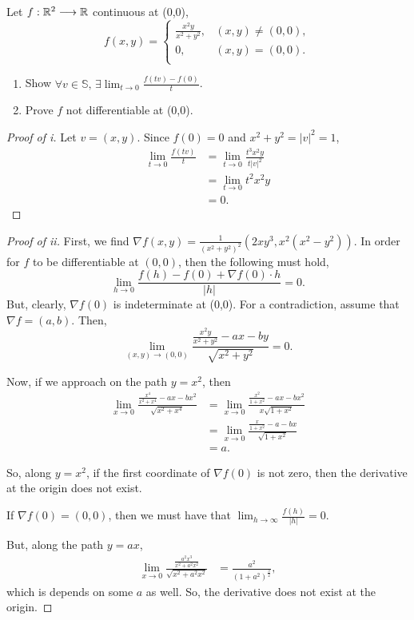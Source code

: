 \documentclass[../hw4]{subfiles}
\begin{document}
\begin{problem}[2]
Let $f:\mathbb{R}^2\longrightarrow\mathbb{R}$ continuous at (0,0), \[
	f(x,y) = \begin{cases}
		\frac{x^2 y}{x^2 + y^2}, & (x,y)\neq (0,0), \\
		0,                       & (x,y)= (0,0).    \\
	\end{cases}
\]
\begin{enumerate}[label=\roman*)]
	\item Show $\forall v \in \mathbb{S},\, \exists \lim_{t \to 0} \frac{f(tv)-f(0)}{t}$.
	\item Prove $f$ not differentiable at (0,0).
\end{enumerate}
\end{problem}
\begin{proof}[Proof of i]
	Let $v=(x,y)$. Since $f(0)=0$ and $x^2 + y^2={|v|}^2=1$, \begin{align*}
		\lim_{t \to 0} \frac{f(tv)}{t} & = \lim_{t \to 0} \frac{t^3x^2y}{t{|v|}^2} \\
		                               & =  \lim_{t \to 0} t^2x^2y                 \\
		                               & = 0
		.\end{align*}
\end{proof}
\begin{proof}[Proof of ii]
	First, we find $\nabla f(x,y) = \frac{1}{{\left( x^2 + y^2 \right) }^2}(2xy^3,x^2\left( x^2 - y^2 \right) )$. In order for $f$ to be differentiable at  $(0,0)$, then the following must hold,  \[
		\lim_{h \to 0} \frac{f(h)-f(0)+\nabla f(0)\cdot h}{|h|}=0
		.\]
	But, clearly, $\nabla f(0)$ is indeterminate at (0,0). For a contradiction, assume that $\nabla f= (a,b)$. Then, \[
		\lim_{(x,y ) \to (0,0)} \frac{\frac{x^2y}{x^2 + y^2}- ax-by}{\sqrt{x^2 + y^2} } =0
		.\]

	Now, if we approach on the path $y=x^2$, then \begin{align*}
		\lim_{x \to 0} \frac{\frac{x^4}{x^2 + x^4}-ax-bx^2}{\sqrt{x^2 + x^4}} & = \lim_{x \to 0} \frac{\frac{x^2}{1+x^2}-ax-bx^2}{x\sqrt{1+x^2} } \\
		                                                                      & =  \lim_{x  \to 0} \frac{\frac{x}{1+x^2}-a-bx}{\sqrt{1+x^2} }     \\
		                                                                      & = a
		.\end{align*}

	So, along $y=x^2$, if the first coordinate of $\nabla f(0)$ is not zero, then the derivative at the origin does not exist.

	If $\nabla f(0)=(0,0)$, then we must have that $\lim_{h \to \infty} \frac{f(h)}{|h|}=0$.

	But, along the path $y=ax$, \begin{align*}
		\lim_{x \to 0} \frac{\frac{a^2x^3}{x^2 + a^2x^2}}{\sqrt{x^2 + a^2x^2}} & = \frac{a^2}{{(1 + a^2)}^{\frac{3}{2}}}
		,\end{align*} which is depends on some $a$ as well. So, the derivative does not exist at the origin.
\end{proof}
\end{document}
